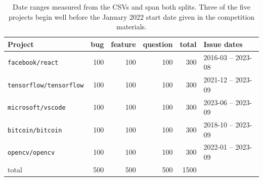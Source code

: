 \begin{table}[htbp]
\centering
\caption{Composition of each split. Both splits have identical structure.}
\label{tab:dataset}
\begin{tabular}{lrrrrl}
\toprule
Project & bug & feature & question & total & Issue dates \\
\midrule
\texttt{facebook/react} & 100 & 100 & 100 & 300 & 2016-03 -- 2023-08 \\
\texttt{tensorflow/tensorflow} & 100 & 100 & 100 & 300 & 2021-12 -- 2023-09 \\
\texttt{microsoft/vscode} & 100 & 100 & 100 & 300 & 2023-06 -- 2023-09 \\
\texttt{bitcoin/bitcoin} & 100 & 100 & 100 & 300 & 2018-10 -- 2023-09 \\
\texttt{opencv/opencv} & 100 & 100 & 100 & 300 & 2022-01 -- 2023-09 \\
\midrule
total & 500 & 500 & 500 & 1500 & \\
\bottomrule
\end{tabular}
\caption*{\footnotesize Date ranges measured from the CSVs and span both splits. Three of the five projects begin well before the January 2022 start date given in the competition materials.}
\end{table}

